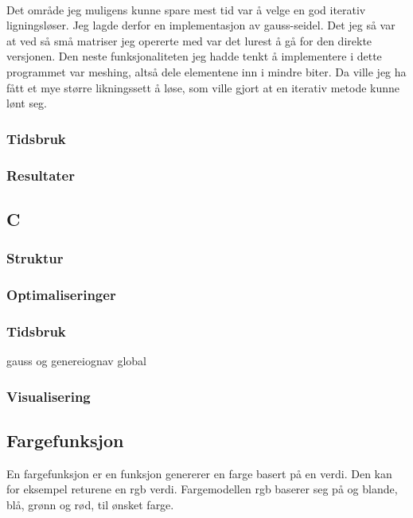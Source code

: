 \documentclass[10pt,a4paper, norsk]{article}
\begin{document}
\paragraph*{}
Det område jeg muligens kunne spare mest tid var å velge en god iterativ ligningsløser. Jeg lagde derfor en implementasjon av gauss-seidel. Det jeg så  var at ved så små matriser jeg opererte med var det lurest å gå for den direkte versjonen. Den neste funksjonaliteten jeg hadde tenkt å implementere i dette programmet var meshing, altså dele elementene inn i mindre biter. Da ville jeg ha fått et mye større likningssett å løse, som ville gjort at en iterativ metode kunne lønt seg. 


\subsubsection{Tidsbruk}
\subsubsection{Resultater}



\subsection{C}

\subsubsection{Struktur}
\subsubsection{Optimaliseringer}
\subsubsection{Tidsbruk}

gauss og genereiognav global
\subsubsection{Visualisering}




\subsection{Fargefunksjon}
En fargefunksjon er en funksjon genererer en farge basert på en verdi. Den kan for eksempel returene en rgb verdi. Fargemodellen rgb baserer seg på og blande, blå, grønn og rød, til ønsket farge. 
\end{document}
